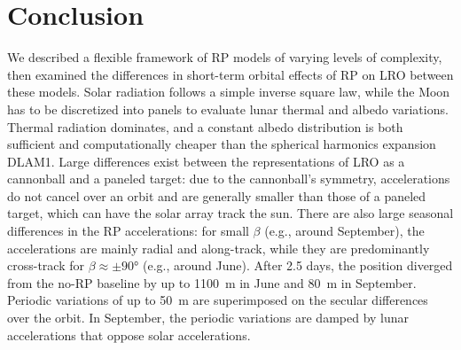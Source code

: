 \section{Conclusion}

We described a flexible framework of \gls{RP} models of varying levels of complexity, then examined the differences in short-term orbital effects of \gls{RP} on \gls{LRO} between these models. Solar radiation follows a simple inverse square law, while the Moon has to be discretized into panels to evaluate lunar thermal and albedo variations. Thermal radiation dominates, and a constant albedo distribution is both sufficient and computationally cheaper than the spherical harmonics expansion \gls{DLAM1}. Large differences exist between the representations of \gls{LRO} as a cannonball and a paneled target: due to the cannonball's symmetry, accelerations do not cancel over an orbit and are generally smaller than those of a paneled target, which can have the solar array track the sun. There are also large seasonal differences in the \gls{RP} accelerations: for small $\beta$ (e.g., around September), the accelerations are mainly radial and along-track, while they are predominantly cross-track for $\beta \approx \pm \ang{90}$ (e.g., around June). After 2.5 days, the position diverged from the no-\gls{RP} baseline by up to \qty{1100}{\m} in June and \qty{80}{\m} in September. Periodic variations of up to \qty{50}{\m} are superimposed on the secular differences over the orbit. In September, the periodic variations are damped by lunar accelerations that oppose solar accelerations.

